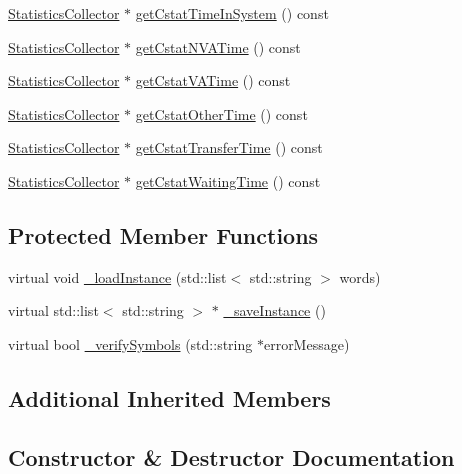 \begin{DoxyCompactItemize}
\hyperlink{class_statistics_collector}{Statistics\+Collector} $\ast$ \hyperlink{class_entity_type_acdcb00168a8fc2e23cf8bf3302464ce3}{get\+Cstat\+Time\+In\+System} () const 
\item 
\hyperlink{class_statistics_collector}{Statistics\+Collector} $\ast$ \hyperlink{class_entity_type_a48e1dedd3e7d7b198ee4e7a61c6afb7e}{get\+Cstat\+N\+V\+A\+Time} () const 
\item 
\hyperlink{class_statistics_collector}{Statistics\+Collector} $\ast$ \hyperlink{class_entity_type_aafb65d3cdceae776da454989b7b4a874}{get\+Cstat\+V\+A\+Time} () const 
\item 
\hyperlink{class_statistics_collector}{Statistics\+Collector} $\ast$ \hyperlink{class_entity_type_a8b6a8b11d428c9e23800d01701e7fbd1}{get\+Cstat\+Other\+Time} () const 
\item 
\hyperlink{class_statistics_collector}{Statistics\+Collector} $\ast$ \hyperlink{class_entity_type_a2604288226dd7fc0c6c322d415b891cc}{get\+Cstat\+Transfer\+Time} () const 
\item 
\hyperlink{class_statistics_collector}{Statistics\+Collector} $\ast$ \hyperlink{class_entity_type_ae43feed54cd8661efb317ef4891bcfcf}{get\+Cstat\+Waiting\+Time} () const 
\end{DoxyCompactItemize}
\subsection*{Protected Member Functions}
\begin{DoxyCompactItemize}
\item 
virtual void \hyperlink{class_entity_type_af88c3d67f9eb8b92b4e32e04bed6730f}{\+\_\+load\+Instance} (std\+::list$<$ std\+::string $>$ words)
\item 
virtual std\+::list$<$ std\+::string $>$ $\ast$ \hyperlink{class_entity_type_a4f6179d5043e750d9555d6eeef8de4cd}{\+\_\+save\+Instance} ()
\item 
virtual bool \hyperlink{class_entity_type_a50e21c4807823132e777529c70bf7cef}{\+\_\+verify\+Symbols} (std\+::string $\ast$error\+Message)
\end{DoxyCompactItemize}
\subsection*{Additional Inherited Members}


\subsection{Constructor \& Destructor Documentation}
